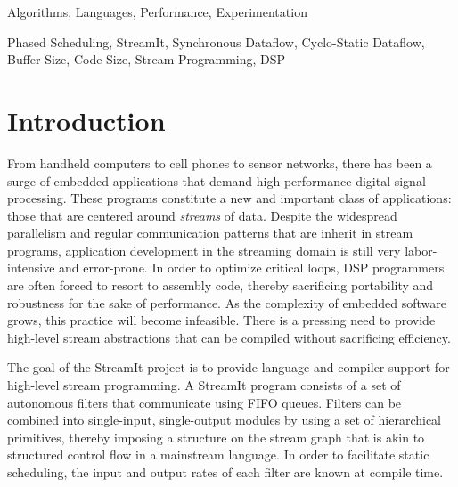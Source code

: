 \documentclass{sig-alt-full}
\begin{document}

\begin{terms}
Algorithms, Languages, Performance, Experimentation
\end{terms}

\begin{keywords}
Phased Scheduling, StreamIt, Synchronous Dataflow, Cyclo-Static Dataflow, Buffer Size, Code Size, Stream Programming, DSP
\end{keywords}
\vspace{6pt}

%
%
\section{Introduction}

From handheld computers to cell phones to sensor networks, there has
been a surge of embedded applications that demand high-performance
digital signal processing.  These programs constitute a new and
important class of applications: those that are centered around {\it
streams} of data.  Despite the widespread parallelism and regular
communication patterns that are inherit in stream programs,
application development in the streaming domain is still very
labor-intensive and error-prone.  In order to optimize critical loops,
DSP programmers are often forced to resort to assembly code, thereby
sacrificing portability and robustness for the sake of performance.
As the complexity of embedded software grows, this practice will
become infeasible.  There is a pressing need to provide high-level
stream abstractions that can be compiled without sacrificing
efficiency.

The goal of the StreamIt project is to provide language and compiler
support for high-level stream programming.  A StreamIt program
consists of a set of autonomous filters that communicate using FIFO
queues.  Filters can be combined into single-input, single-output
modules by using a set of hierarchical primitives, thereby imposing a
structure on the stream graph that is akin to structured control flow
in a mainstream language.  In order to facilitate static scheduling,
the input and output rates of each filter are known at compile time.
\end{document}
